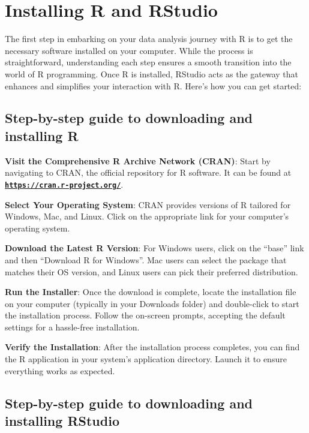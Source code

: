 \documentclass[
  b5paper]{book}
\begin{document}
\hypertarget{installing-r-and-rstudio}{%
\section{Installing R and RStudio}\label{installing-r-and-rstudio}}

The first step in embarking on your data analysis journey with R is to get the necessary software installed on your computer. While the process is straightforward, understanding each step ensures a smooth transition into the world of R programming. Once R is installed, RStudio acts as the gateway that enhances and simplifies your interaction with R. Here's how you can get started:

\hypertarget{step-by-step-guide-to-downloading-and-installing-r}{%
\subsection*{Step-by-step guide to downloading and installing R}\label{step-by-step-guide-to-downloading-and-installing-r}}

\textbf{Visit the Comprehensive R Archive Network (CRAN)}: Start by navigating to CRAN, the official repository for R software. It can be found at \href{https://cran.r-project.org/}{\textbf{\texttt{https://cran.r-project.org/}}}.

\textbf{Select Your Operating System}: CRAN provides versions of R tailored for Windows, Mac, and Linux. Click on the appropriate link for your computer's operating system.

\textbf{Download the Latest R Version}: For Windows users, click on the ``base'' link and then ``Download R for Windows''. Mac users can select the package that matches their OS version, and Linux users can pick their preferred distribution.

\textbf{Run the Installer}: Once the download is complete, locate the installation file on your computer (typically in your Downloads folder) and double-click to start the installation process. Follow the on-screen prompts, accepting the default settings for a hassle-free installation.

\textbf{Verify the Installation}: After the installation process completes, you can find the R application in your system's application directory. Launch it to ensure everything works as expected.

\hypertarget{step-by-step-guide-to-downloading-and-installing-rstudio}{%
\subsection*{Step-by-step guide to downloading and installing RStudio}\label{step-by-step-guide-to-downloading-and-installing-rstudio}}
\end{document}
